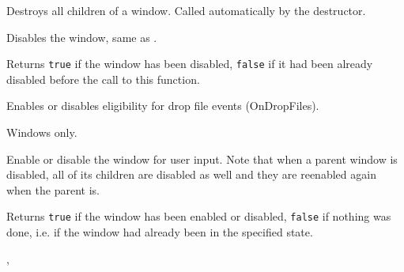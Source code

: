 Destroys all children of a window.  Called automatically by the destructor.

\label{wxwindowdisable}


Disables the window, same as .


Returns {\tt true} if the window has been disabled, {\tt false} if it had been
already disabled before the call to this function.

\label{wxwindowdragacceptfiles}


Enables or disables eligibility for drop file events (OnDropFiles).




Windows only.

\label{wxwindowenable}


Enable or disable the window for user input. Note that when a parent window is
disabled, all of its children are disabled as well and they are reenabled again
when the parent is.




Returns {\tt true} if the window has been enabled or disabled, {\tt false} if
nothing was done, i.e. if the window had already been in the specified state.


,\rtfsp
{}

\label{wxwindowfindfocus}


